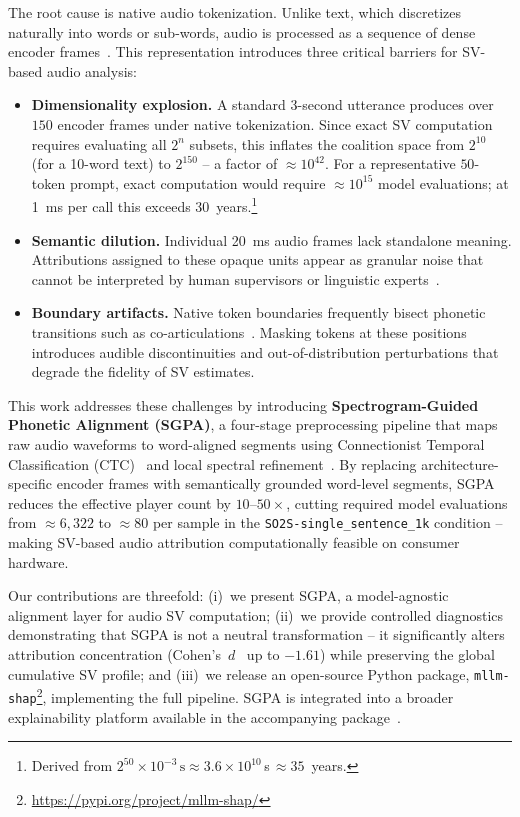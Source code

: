 \documentclass[cameraready]{Interspeech}
\begin{document}
The root cause is native audio tokenization. Unlike text, which discretizes naturally into words or sub-words, audio is processed as a sequence of dense encoder frames~\cite{yang2025largelanguagemodelsmeet}. This representation introduces three critical barriers for SV-based audio analysis:

\begin{itemize}
    \item \textbf{Dimensionality explosion.} A standard $3$-second utterance produces over $150$ encoder frames under native tokenization. Since exact SV computation requires evaluating all $2^n$ subsets, this inflates the coalition space from $2^{10}$ (for a 10-word text) to $2^{150}$ -- a factor of ${\approx}10^{42}$. For a representative $50$-token prompt, exact computation would require ${\approx}10^{15}$ model evaluations; at \SI{1}{\milli\second} per call this exceeds $30$~years.\footnote{Derived from $2^{50} \times 10^{-3}\,\text{s} \approx 3.6 \times 10^{10}$\,s\,$\approx 35$~years.}
    \item \textbf{Semantic dilution.} Individual \SI{20}{\milli\second} audio frames lack standalone meaning. Attributions assigned to these opaque units appear as granular noise that cannot be interpreted by human supervisors or linguistic experts~\cite{mosca-etal-2022-shap}.
    \item \textbf{Boundary artifacts.} Native token boundaries frequently bisect phonetic transitions such as co-articulations~\cite{ladefoged2014course, hardcastle1999coarticulation}. Masking tokens at these positions introduces audible discontinuities and out-of-distribution perturbations that degrade the fidelity of SV estimates.
\end{itemize}

This work addresses these challenges by introducing \textbf{Spectrogram-Guided Phonetic Alignment (SGPA)}, a four-stage preprocessing pipeline that maps raw audio waveforms to word-aligned segments using Connectionist Temporal Classification (CTC)~\cite{graves2006connectionist} and local spectral refinement~\cite{mcfee2015librosa}. By replacing architecture-specific encoder frames with semantically grounded word-level segments, SGPA reduces the effective player count by $10$--$50\times$, cutting required model evaluations from ${\approx}6{,}322$ to ${\approx}80$ per sample in the \texttt{SO2S-single\_sentence\_1k} condition -- making SV-based audio attribution computationally feasible on consumer hardware.

Our contributions are threefold: (i)~we present SGPA, a model-agnostic alignment layer for audio SV computation; (ii)~we provide controlled diagnostics demonstrating that SGPA is not a neutral transformation -- it significantly alters attribution concentration (Cohen's~$d$~\cite{cohen1988statistical} up to \textit{$-1.61$}) while preserving the global cumulative SV profile; and (iii)~we release an open-source Python package, \texttt{mllm-shap}\footnote{\url{https://pypi.org/project/mllm-shap/}}, implementing the full pipeline. SGPA is integrated into a broader explainability platform available in the accompanying package~\cite{pozorskimuszynskimllmshap}.
\end{document}
